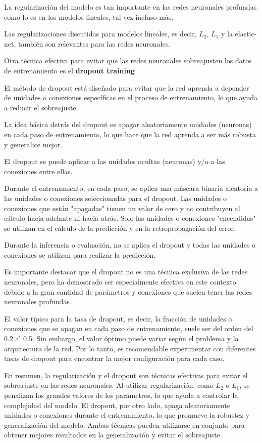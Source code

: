 La regularización del modelo es tan importante en las redes neuronales profundas como lo es en los modelos lineales, tal vez incluso más.

Las regularizaciones discutidas para modelos lineales, es decir, $L_2$, $L_1$ y la elastic-net, también son relevantes para las redes neuronales.

Otra técnica efectiva para evitar que las redes neuronales sobreajusten los datos de entrenamiento es el \textbf{dropout training} \cite{srivastava2014dropout}.

El método de dropout está diseñado para evitar que la red aprenda a depender de unidades o conexiones específicas en el proceso de entrenamiento, lo que ayuda a reducir el sobreajuste.

La idea básica detrás del dropout es apagar aleatoriamente unidades (neuronas) en cada paso de entrenamiento, lo que hace que la red aprenda a ser más robusta y generalice mejor.

El dropout  se puede aplicar a las unidades ocultas (neuronas) y/o a las conexiones entre ellas.

Durante el entrenamiento, en cada paso, se aplica una máscara binaria aleatoria a las unidades o conexiones seleccionadas para el dropout. Las unidades o conexiones que están "apagadas" tienen un valor de cero y no contribuyen al cálculo hacia adelante ni hacia atrás. Solo las unidades o conexiones "encendidas" se utilizan en el cálculo de la predicción y en la retropropagación del error.

Durante la inferencia o evaluación, no se aplica el dropout y todas las unidades o conexiones se utilizan para realizar la predicción.

Es importante destacar que el dropout no es una técnica exclusiva de las redes neuronales, pero ha demostrado ser especialmente efectiva en este contexto debido a la gran cantidad de parámetros y conexiones que suelen tener las redes neuronales profundas.

El valor típico para la tasa de dropout, es decir, la fracción de unidades o conexiones que se apagan en cada paso de entrenamiento, suele ser del orden del 0.2 al 0.5. Sin embargo, el valor óptimo puede variar según el problema y la arquitectura de la red. Por lo tanto, es recomendable experimentar con diferentes tasas de dropout para encontrar la mejor configuración para cada caso.

En resumen, la regularización y el dropout son técnicas efectivas para evitar el sobreajuste en las redes neuronales. Al utilizar regularización, como $L_2$ o $L_1$, se penalizan los grandes valores de los parámetros, lo que ayuda a controlar la complejidad del modelo. El dropout, por otro lado, apaga aleatoriamente unidades o conexiones durante el entrenamiento, lo que promueve la robustez y generalización del modelo. Ambas técnicas pueden utilizarse en conjunto para obtener mejores resultados en la generalización y evitar el sobreajuste.


